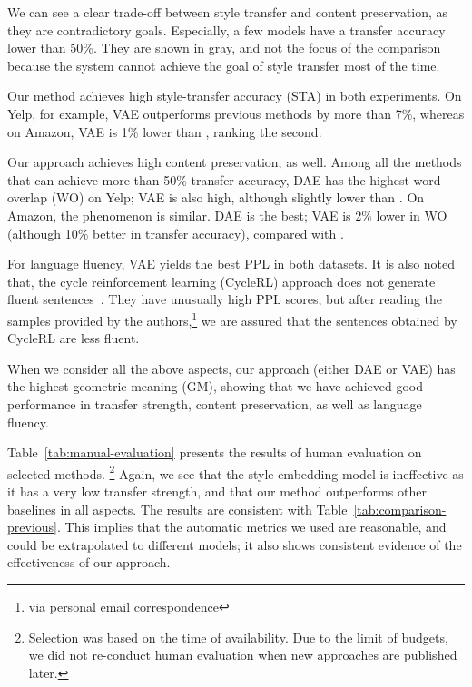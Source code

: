 \documentclass[11pt,a4paper]{article}
\begin{document}
We can see a clear trade-off between style transfer and content preservation, as they are contradictory goals. Especially, a few models have a transfer accuracy lower than 50\%. They are shown in gray, and not the focus of the comparison because the system cannot achieve the goal of style transfer most of the time.

Our method achieves high style-transfer accuracy (STA) in both experiments.
On Yelp, for example, VAE outperforms previous methods by more than 7\%, whereas on Amazon, VAE is 1\% lower than \citet{prabhumoye2018style}, ranking the second.

Our approach achieves high content preservation, as well.
Among all the methods that can achieve more than 50\% transfer accuracy, DAE has the highest word overlap (WO) on Yelp; VAE is also high, although slightly lower than \citet{li2018delete}.
On Amazon, the phenomenon is similar. DAE is the best; VAE is 2\% lower in WO  (although 10\% better in transfer accuracy), compared with \citet{xu2018unpaired}.

For language fluency, VAE yields the best PPL in both datasets. It is also noted that, the cycle reinforcement learning (CycleRL) approach does not generate fluent sentences~\cite{xu2018unpaired}. They have unusually high PPL scores, but after reading the samples provided by the authors,\footnote{via personal email correspondence} we are assured that the sentences obtained by CycleRL are less fluent.

When we consider all the above aspects, our approach (either DAE or VAE) has the highest geometric meaning (GM), showing that we have achieved good performance in transfer strength, content preservation, as well as language fluency.

Table~\ref{tab:manual-evaluation} presents the results of human evaluation on selected methods.
\footnote{Selection was based on the time of availability. Due to the limit of budgets, we did not re-conduct human evaluation when new approaches are published later.}
Again, we see that the style embedding model \cite{fu2018style} is ineffective as it has a very low transfer strength, and that our method outperforms other baselines in all aspects. The results are consistent with Table~\ref{tab:comparison-previous}. This implies that the automatic metrics we used are reasonable, and could be  extrapolated to different models; it also shows consistent evidence of the effectiveness of our approach. 
\end{document}
